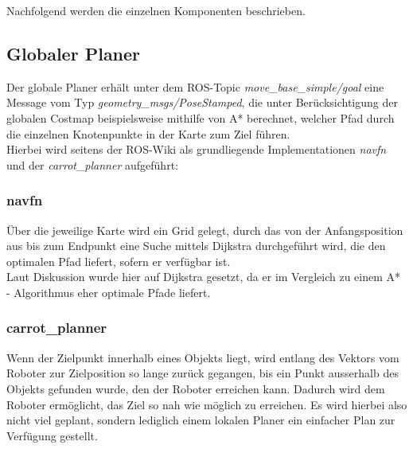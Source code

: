 \documentclass[oribibl]{llncs}
\begin{document}
Nachfolgend werden die einzelnen Komponenten beschrieben.

\subsection{Globaler Planer} \label{globalPlanner}
Der globale Planer erhält unter dem ROS-Topic \textit{move\_base\_simple/goal} eine Message vom Typ \textit{geometry\_msgs/PoseStamped}, die unter Berücksichtigung der globalen Costmap beispielsweise mithilfe von A* berechnet, welcher Pfad durch die einzelnen Knotenpunkte in der Karte zum Ziel führen.\\
Hierbei wird seitens der ROS-Wiki als grundliegende Implementationen \textit{navfn} und der \textit{carrot\_planner} aufgeführt:
\subsubsection{navfn}
Über die jeweilige Karte wird ein Grid gelegt, durch das von der Anfangsposition aus bis zum Endpunkt eine Suche mittels Dijkstra durchgeführt wird, die den optimalen Pfad liefert, sofern er verfügbar ist.\\
Laut Diskussion wurde hier auf Dijkstra gesetzt, da er im Vergleich zu einem A* - Algorithmus eher optimale Pfade liefert. \cite{navfn}
\subsubsection{carrot\_planner}
Wenn der Zielpunkt innerhalb eines Objekts liegt, wird entlang des Vektors vom Roboter zur Zielposition so lange zurück gegangen, bis ein Punkt ausserhalb des Objekts gefunden wurde, den der Roboter erreichen kann. Dadurch wird dem Roboter ermöglicht, das Ziel so nah wie möglich zu erreichen. Es wird hierbei also nicht viel geplant, sondern lediglich einem lokalen Planer ein einfacher Plan zur Verfügung gestellt. \cite{carrotPlanner}
\end{document}
